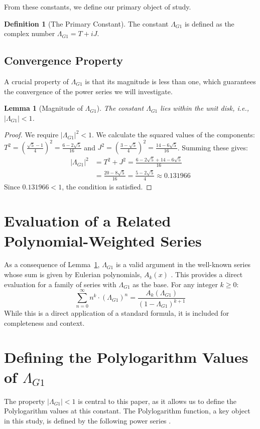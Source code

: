 \documentclass{amsart}
\theoremstyle{plain}
\newtheorem{lemma}[theorem]{Lemma}
\theoremstyle{definition}
\newtheorem{definition}[theorem]{Definition}
\theoremstyle{remark}
\newcommand{\LambdaG}{\Lambda_{G1}}
\begin{document}
From these constants, we define our primary object of study.
\begin{definition}[The Primary Constant]
The constant $\LambdaG$ is defined as the complex number $\LambdaG = T+iJ$.
\end{definition}

\subsection{Convergence Property}
A crucial property of $\LambdaG$ is that its magnitude is less than one, which guarantees the convergence of the power series we will investigate.

\begin{lemma}[Magnitude of $\LambdaG$]
\label{lem:convergence}
The constant $\LambdaG$ lies within the unit disk, i.e., $|\LambdaG| < 1$.
\end{lemma}
\begin{proof}
We require $|\LambdaG|^2 < 1$. We calculate the squared values of the components:
$T^2 = \left(\frac{\sqrt{5}-1}{4}\right)^2 = \frac{6-2\sqrt{5}}{16}$ and $J^2 = \left(\frac{3-\sqrt{5}}{4}\right)^2 = \frac{14-6\sqrt{5}}{16}$.
Summing these gives:
\begin{align*}
    |\LambdaG|^2 &= T^2+J^2 = \frac{6-2\sqrt{5} + 14-6\sqrt{5}}{16} \\
                 &= \frac{20-8\sqrt{5}}{16} = \frac{5-2\sqrt{5}}{4} \approx 0.131966
\end{align*}
Since $0.131966 < 1$, the condition is satisfied.
\end{proof}

\section{Evaluation of a Related Polynomial-Weighted Series}
As a consequence of Lemma~\ref{lem:convergence}, $\LambdaG$ is a valid argument in the well-known series whose sum is given by Eulerian polynomials, $A_k(x)$ \cite{AandS}. This provides a direct evaluation for a family of series with $\LambdaG$ as the base. For any integer $k \ge 0$:
$$ \sum_{n=0}^{\infty} n^k \cdot (\LambdaG)^n = \frac{A_k(\LambdaG)}{(1-\LambdaG)^{k+1}} $$
While this is a direct application of a standard formula, it is included for completeness and context.

\section{Defining the Polylogarithm Values of \texorpdfstring{$\LambdaG$}{Lambda\_G1}}
The property $|\LambdaG| < 1$ is central to this paper, as it allows us to define the Polylogarithm values at this constant. The Polylogarithm function, a key object in this study, is defined by the following power series \cite{Lewin}.
\end{document}
